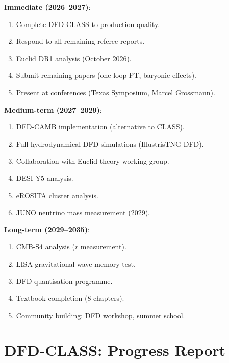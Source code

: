 \documentclass[11pt,a4paper]{article}
\begin{document}
\begin{tcolorbox}[colback=blue!5!white, colframe=dfdblue, title=\textbf{Post-Programme Roadmap (2027+)}]

\textbf{Immediate (2026--2027)}:
\begin{enumerate}[nosep]
\item Complete DFD-CLASS to production quality.
\item Respond to all remaining referee reports.
\item Euclid DR1 analysis (October 2026).
\item Submit remaining papers (one-loop PT, baryonic effects).
\item Present at conferences (Texas Symposium, Marcel Grossmann).
\end{enumerate}

\textbf{Medium-term (2027--2029)}:
\begin{enumerate}[nosep]
\item DFD-CAMB implementation (alternative to CLASS).
\item Full hydrodynamical DFD simulations (IllustrisTNG-DFD).
\item Collaboration with Euclid theory working group.
\item DESI Y5 analysis.
\item eROSITA cluster analysis.
\item JUNO neutrino mass measurement (2029).
\end{enumerate}

\textbf{Long-term (2029--2035)}:
\begin{enumerate}[nosep]
\item CMB-S4 analysis ($r$ measurement).
\item LISA gravitational wave memory test.
\item DFD quantisation programme.
\item Textbook completion (8 chapters).
\item Community building: DFD workshop, summer school.
\end{enumerate}
\end{tcolorbox}

\section{DFD-CLASS: Progress Report}
\end{document}
